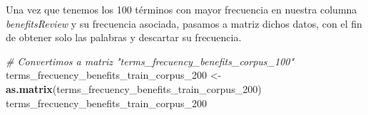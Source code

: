 \documentclass[spanish,]{article}
\newenvironment{Shaded}{\begin{snugshade}}{\end{snugshade}}
\newcommand{\KeywordTok}[1]{\textcolor[rgb]{0.13,0.29,0.53}{\textbf{#1}}}
\newcommand{\DecValTok}[1]{\textcolor[rgb]{0.00,0.00,0.81}{#1}}
\newcommand{\StringTok}[1]{\textcolor[rgb]{0.31,0.60,0.02}{#1}}
\newcommand{\CommentTok}[1]{\textcolor[rgb]{0.56,0.35,0.01}{\textit{#1}}}
\newcommand{\NormalTok}[1]{#1}
\begin{document}
Una vez que tenemos los 100 términos con mayor frecuencia en nuestra
columna \emph{benefitsReview} y su frecuencia asociada, pasamos a matriz
dichos datos, con el fin de obtener solo las palabras y descartar su
frecuencia.

\begin{Shaded}
\begin{Highlighting}[]
\CommentTok{# Convertimos a matriz "terms_frecuency_benefits_corpus_100"}
\NormalTok{terms_frecuency_benefits_train_corpus_}\DecValTok{200}\NormalTok{ <-}\StringTok{ }\KeywordTok{as.matrix}\NormalTok{(terms_frecuency_benefits_train_corpus_}\DecValTok{200}\NormalTok{)}
\NormalTok{terms_frecuency_benefits_train_corpus_}\DecValTok{200}
\end{Highlighting}
\end{Shaded}
\end{document}
